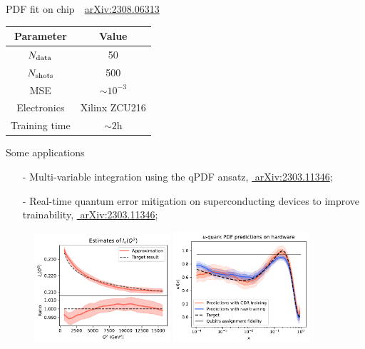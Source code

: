 \documentclass[aspectratio=169, 8pt, xcolor={svgnames}, hyperref={linkcolor=black}]{beamer}
\begin{document}
\begin{frame}{PDF fit on chip \hfill \faBook\,\, \href{https://arxiv.org/abs/2308.06313}{arXiv:2308.06313}}
\begin{multicols}{2}
\begin{center}
\begin{table}
\begin{tabular}{cc}
\hline \hline 
\textbf{Parameter} & \textbf{Value} \\
\hline 
$N_{\rm data}$ & 50 \\
$N_{\rm shots}$ & 500 \\
MSE & $\sim 10^{-3}$ \\
Electronics & Xilinx ZCU216 \\
Training time & $\sim 2$h \\
\hline \hline
\end{tabular}
\end{table}
\end{center}
\vspace{0.5cm}
\end{multicols}
\end{frame}

\begin{frame}{Some applications}
  \small
  \begin{itemize}
  \item[-] Multi-variable integration using the qPDF ansatz, \href{https://arxiv.org/abs/2303.11346}{\faBook\,\,arXiv:2303.11346};
  \item[-] Real-time quantum error mitigation on superconducting devices to improve trainability,
  \href{https://arxiv.org/abs/2303.11346}{\faBook\,\,arXiv:2303.11346};
  \end{itemize}
    \begin{figure}
      \includegraphics[width=0.45\textwidth]{figures/uquark2d.pdf}%
      \includegraphics[width=0.45\textwidth]{figures/hardware.pdf}
    \end{figure}
\end{frame}
\end{document}
